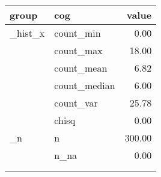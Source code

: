 \begin{tabular}{llr}
  \toprule
 \textnormal{group} & \textnormal{cog} & \textnormal{value} \\ 
  \midrule
   \_hist\_x & count\_min & 0.00 \\ 
    & count\_max & 18.00 \\ 
    & count\_mean & 6.82 \\ 
    & count\_median & 6.00 \\ 
    & count\_var & 25.78 \\ 
  \bigskip  & chisq & 0.00 \\ 
   \_n & n & 300.00 \\ 
    & n\_na & 0.00 \\ 
    &  &  \\ 
    &  &  \\ 
   \bottomrule
\end{tabular}
